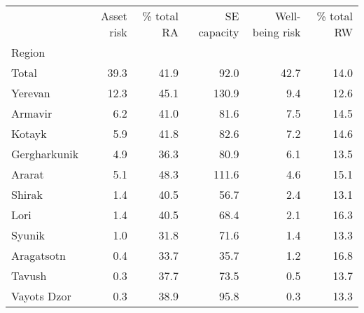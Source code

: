\begin{tabular}{lrrrrr}
\toprule
{} &  Asset risk &  \% total RA &  SE capacity &  Well-being risk &  \% total RW \\
Region       &             &             &              &                  &             \\
\midrule
Total        &        39.3 &        41.9 &         92.0 &             42.7 &        14.0 \\
Yerevan      &        12.3 &        45.1 &        130.9 &              9.4 &        12.6 \\
Armavir      &         6.2 &        41.0 &         81.6 &              7.5 &        14.5 \\
Kotayk       &         5.9 &        41.8 &         82.6 &              7.2 &        14.6 \\
Gergharkunik &         4.9 &        36.3 &         80.9 &              6.1 &        13.5 \\
Ararat       &         5.1 &        48.3 &        111.6 &              4.6 &        15.1 \\
Shirak       &         1.4 &        40.5 &         56.7 &              2.4 &        13.1 \\
Lori         &         1.4 &        40.5 &         68.4 &              2.1 &        16.3 \\
Syunik       &         1.0 &        31.8 &         71.6 &              1.4 &        13.3 \\
Aragatsotn   &         0.4 &        33.7 &         35.7 &              1.2 &        16.8 \\
Tavush       &         0.3 &        37.7 &         73.5 &              0.5 &        13.7 \\
Vayots Dzor  &         0.3 &        38.9 &         95.8 &              0.3 &        13.3 \\
\bottomrule
\end{tabular}

